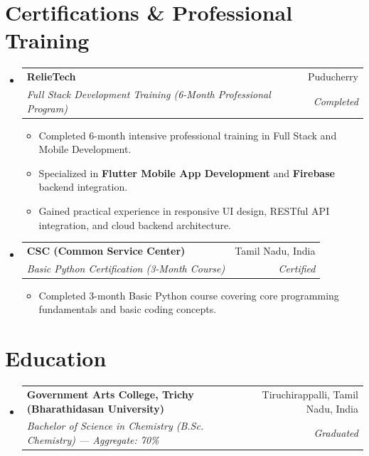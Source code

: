 \documentclass[letterpaper,10pt]{article}
\makeatletter
\newcommand{\resumeItem}[1]{
  \item\small{
    {#1}
  }
}
\newcommand{\resumeSubheading}[4]{
  \vspace{-2pt}\item
    \begin{tabular*}{0.97\textwidth}[t]{l@{\extracolsep{\fill}}r}
      \textbf{#1} & #2 \\
      \textit{\small#3} & \textit{\small #4} \\
    \end{tabular*}\vspace{-6pt}
}
\newcommand{\resumeSubHeadingListStart}{\begin{itemize}[leftmargin=0.15in, label={}]}
\newcommand{\resumeSubHeadingListEnd}{\end{itemize}\vspace{-3pt}}
\newcommand{\resumeItemListStart}{\begin{itemize}[leftmargin=0.15in, label=\tiny$\bullet$, noitemsep, topsep=1pt]}
\newcommand{\resumeItemListEnd}{\end{itemize}\vspace{-3pt}}
\makeatother
\begin{document}
\section{Certifications \& Professional Training}
  \resumeSubHeadingListStart
    \resumeSubheading
      {RelieTech}{Puducherry}
      {Full Stack Development Training (6-Month Professional Program)}{Completed}
      \resumeItemListStart
        \resumeItem{Completed 6-month intensive professional training in Full Stack and Mobile Development.}
        \resumeItem{Specialized in \textbf{Flutter Mobile App Development} and \textbf{Firebase} backend integration.}
        \resumeItem{Gained practical experience in responsive UI design, RESTful API integration, and cloud backend architecture.}
      \resumeItemListEnd

    \resumeSubheading
      {CSC (Common Service Center)}{Tamil Nadu, India}
      {Basic Python Certification (3-Month Course)}{Certified}
      \resumeItemListStart
        \resumeItem{Completed 3-month Basic Python course covering core programming fundamentals and basic coding concepts.}
      \resumeItemListEnd
  \resumeSubHeadingListEnd


\section{Education}
  \resumeSubHeadingListStart
    \resumeSubheading
      {Government Arts College, Trichy (Bharathidasan University)}{Tiruchirappalli, Tamil Nadu, India}
      {Bachelor of Science in Chemistry (B.Sc. Chemistry) --- Aggregate: 70\%}{Graduated}
  \resumeSubHeadingListEnd

\end{document}
